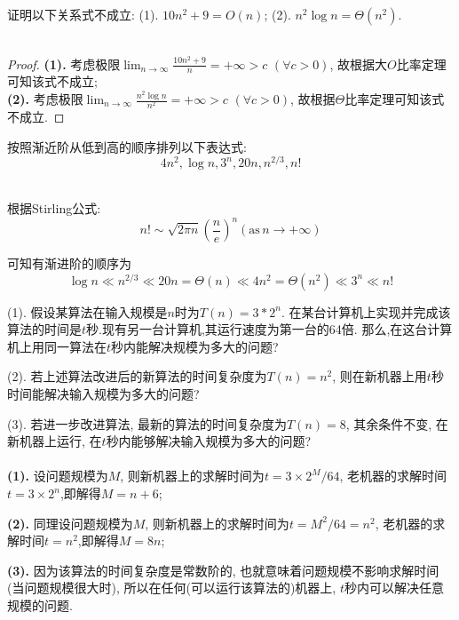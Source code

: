 \documentclass{article}
\begin{document}
\pagebreak


\begin{homeworkProblem}
	证明以下关系式不成立: (1). $10n^2+9=O\left( n \right) $; \quad (2). $n^2\log n=\Theta \left( n^2 \right)$.
	\\

	\solution
	\\

	\begin{proof}

		\textbf{(1).} 考虑极限$\displaystyle \lim_{n\rightarrow \infty} \frac{10n^2+9}{n}=+\infty >c\,\,\left( \forall c>0 \right) $, 故根据大$O$比率定理可知该式不成立;
		\\ 

		\textbf{(2).} 考虑极限$\displaystyle \lim_{n\rightarrow \infty} \frac{n^2\log n}{n^2}=+\infty >c\,\,\left( \forall c>0 \right) $, 故根据$\Theta$比率定理可知该式不成立.
	\end{proof}
	
\end{homeworkProblem}

\begin{homeworkProblem}
	按照渐近阶从低到高的顺序排列以下表达式:
	$$4 n^2, \log n, 3^n, 20 n, n^{2 / 3}, n !$$

	\solution
	\\

	根据Stirling公式:$$n!\sim \sqrt{2\pi n}\left( \frac{n}{e} \right) ^n (\text{as}\, n\to +\infty)$$

	可知有渐进阶的顺序为$$\log n\ll n^{2 / 3} \ll 20n=\Theta \left( n \right) \ll 4n^2=\Theta \left( n^2 \right) \ll 3^n\ll n!
	$$
\end{homeworkProblem}

\begin{homeworkProblem}

	(1). 假设某算法在输入规模是$n$时为$T(n)=3\ast 2^n$. 在某台计算机上实现并完成该算法的时间是$t$秒.现有另一台计算机,其运行速度为第一台的64倍. 那么,在这台计算机上用同一算法在$t$秒内能解决规模为多大的问题?

	(2). 若上述算法改进后的新算法的时间复杂度为$T(n)=n^2$, 则在新机器上用$t$秒时间能解决输入规模为多大的问题?

	(3). 若进一步改进算法, 最新的算法的时间复杂度为$T(n)=8$, 其余条件不变, 在新机器上运行, 在$t$秒内能够解决输入规模为多大的问题?
	\\

	\solution
	\\

	\textbf{(1).} 设问题规模为$M$, 则新机器上的求解时间为$t=3\times 2^M/64$, 老机器的求解时间$t= 3\times 2^n$,即解得$M=n+6$;

	\textbf{(2).} 同理设问题规模为$M$, 则新机器上的求解时间为$t=M^2/64=n^2$, 老机器的求解时间$t=n^2$,即解得$M=8n$;

	\textbf{(3).} 因为该算法的时间复杂度是常数阶的, 也就意味着问题规模不影响求解时间(当问题规模很大时), 所以在任何(可以运行该算法的)机器上, $t$秒内可以解决任意规模的问题.

\end{homeworkProblem}
\end{document}

